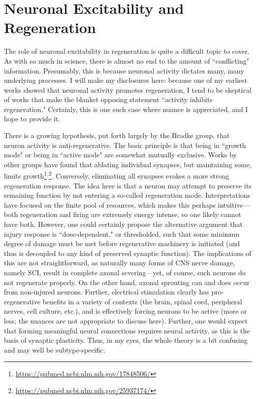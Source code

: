\section{Neuronal Excitability and Regeneration}

The role of neuronal excitability in regeneration is quite a difficult topic to cover. As with so much in science, there is almost no end to the amount of ``conflicting" information. Presumably, this is because neuronal activity dictates many, many underlying processes. I will make my disclosures here: because one of my earliest works showed that neuronal activity promotes regeneration, I tend to be skeptical of works that make the blanket opposing statement ``activity inhibits regeneration." Certainly, this is one such case where nuance is appreciated, and I hope to provide it.\newline   

 There is a growing hypothesis, put forth largely by the Bradke group, that neuron activity is anti-regenerative. The basic principle is that being in ``growth mode" or being in ``active mode" are somewhat mutually exclusive. Works by other groups have found that ablating individual synapses, but maintaining some, limits growth\footnote{\url{https://pubmed.ncbi.nlm.nih.gov/17848506/}}$^,$\footnote{\url{https://pubmed.ncbi.nlm.nih.gov/25937174/}}. Conversely, eliminating all synapses evokes a more strong regeneration response. The idea here is that a neuron may attempt to preserve its remaining function by not entering a so-called regeneration mode. Interpretations have focused on the finite pool of resources, which makes this perhaps intuitive---both regeneration and firing are extremely energy intense, so one likely cannot have both. However, one could certainly propose the alternative argument that injury response is ``dose-dependent," or thresholded, such that some minimum degree of damage must be met before regenerative machinery is initiated (and thus is decoupled to any kind of preserved synaptic function). The implications of this are not straightforward, as naturally many forms of CNS nerve damage, namely SCI, result in complete axonal severing---yet, of course, such neurons do not regenerate properly. On the other hand, axonal sprouting can and does occur from non-injured neurons. Further, electrical stimulation clearly has pro-regenerative benefits in a variety of contexts (the brain, spinal cord, peripheral nerves, cell culture, etc.), and is effectively forcing neurons to be active (more or less; the nuances are not appropriate to discuss here). Further, one would expect that forming meaningful neural connections requires neural activity, as this is the basis of synaptic plasticity. Thus, in my eyes, the whole theory is a bit confusing and may well be subtype-specific.\newline

